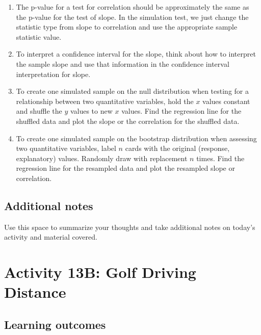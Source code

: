 \documentclass[
]{report}
\begin{document}
\begin{enumerate}
\def\labelenumi{\arabic{enumi}.}
\item
  The p-value for a test for correlation should be approximately the same as the p-value for the test of slope. In the simulation test, we just change the statistic type from slope to correlation and use the appropriate sample statistic value.
\item
  To interpret a confidence interval for the slope, think about how to interpret the sample slope and use that information in the confidence interval interpretation for slope.
\item
  To create one simulated sample on the null distribution when testing for a relationship between two quantitative variables, hold the \(x\) values constant and shuffle the \(y\) values to new \(x\) values. Find the regression line for the shuffled data and plot the slope or the correlation for the shuffled data.
\item
  To create one simulated sample on the bootstrap distribution when assessing two quantitative variables, label \(n\) cards with the original (response, explanatory) values. Randomly draw with replacement \(n\) times. Find the regression line for the resampled data and plot the resampled slope or correlation.
\end{enumerate}

\hypertarget{additional-notes-19}{%
\subsection{Additional notes}\label{additional-notes-19}}

Use this space to summarize your thoughts and take additional notes on today's activity and material covered.

\newpage

\hypertarget{activity-13b-golf-driving-distance}{%
\section{Activity 13B: Golf Driving Distance}\label{activity-13b-golf-driving-distance}}


\hypertarget{learning-outcomes-26}{%
\subsection{Learning outcomes}\label{learning-outcomes-26}}
\end{document}
